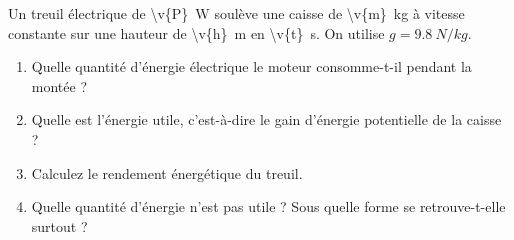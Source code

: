 Un treuil électrique de \qty{\v{P}}{W} soulève une caisse de \qty{\v{m}}{kg} à vitesse constante sur une hauteur de \qty{\v{h}}{m} en \qty{\v{t}}{s}. On utilise $g = \qty{9.8}{N/kg}$.

\begin{enumerate}[label=\alph*)]
    \item Quelle quantité d'énergie électrique le moteur consomme-t-il pendant la montée ?
    \item Quelle est l'énergie utile, c'est-à-dire le gain d'énergie potentielle de la caisse ?
    \item Calculez le rendement énergétique du treuil.
    \item Quelle quantité d'énergie n'est pas utile ? Sous quelle forme se retrouve-t-elle surtout ?
\end{enumerate}
